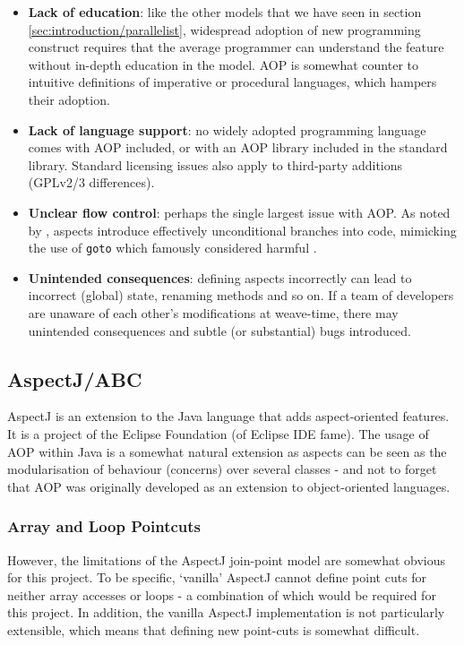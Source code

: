 	\begin{itemize}
		\item \textbf{Lack of education}: like the other models that we have seen in section \ref{sec:introduction/parallelist}, widespread adoption of new programming construct requires that the average programmer can understand the feature without in-depth education in the model. AOP is somewhat counter to intuitive definitions of imperative or procedural languages, which hampers their adoption.
		\item \textbf{Lack of language support}: no widely adopted programming language comes with AOP included, or with an AOP library included in the standard library. Standard licensing issues also apply to third-party additions (\eg GPLv2/3 differences).
		\item \textbf{Unclear flow control}: perhaps the single largest issue with AOP. As noted by \citet{Constantinides2004}, aspects introduce effectively unconditional branches into code, mimicking the use of \texttt{goto} which \citeauthor{Dijkstra1968} famously considered harmful \citep{Dijkstra1968}.
		\item \textbf{Unintended consequences}: defining aspects incorrectly can lead to incorrect (global) state, \eg renaming methods and so on. If a team of developers are unaware of each other's modifications at weave-time, there may unintended consequences and subtle (or substantial) bugs introduced.
	\end{itemize}
	
	\subsection{AspectJ/ABC} \label{sec:instrumentation/aop/aspectj}
	AspectJ \citep{Kiczales2001} is an extension to the Java language that adds aspect-oriented features. It is a project of the Eclipse Foundation (of Eclipse IDE fame). The usage of AOP within Java is a somewhat natural extension as aspects can be seen as the modularisation of behaviour (concerns) over several classes - and not to forget that AOP was originally developed as an extension to object-oriented languages.
		
		\subsubsection{Array and Loop Pointcuts} \label{sec:instrumentation/aop/aspectj/arrayloop}
		However, the limitations of the AspectJ join-point model are somewhat obvious for this project. To be specific, `vanilla' AspectJ cannot define point cuts for neither array accesses or loops - a combination of which would be required for this project. In addition, the vanilla AspectJ implementation is not particularly extensible, which means that defining new point-cuts is somewhat difficult.
		
